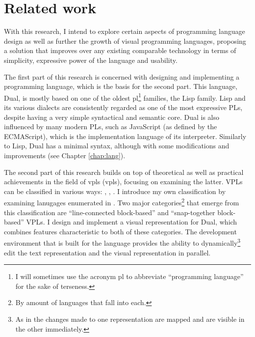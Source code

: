 \section{Related work}
With this research, I intend to explore certain aspects of programming language design as well as further the growth of visual programming languages, proposing a solution that improves over any existing comparable technology in terms of simplicity, expressive power of the language and usability.

The first part of this research is concerned with designing and implementing a programming language, which is the basis for the second part. This language, Dual, is mostly based on one of the oldest \acrshort{pl}\footnote{I will sometimes use the acronym \acrshort{pl} to abbreviate ``programming language'' for the sake of terseness.} families, the Lisp\cite{lisp_draft}\cite{lisp_wikipedia} family. Lisp and its various dialects are consistently regarded as one of the most expressive PLs\cite{lisp_expressive, lisp_powerful}, despite having a very simple syntactical and semantic core\cite{lisp_simple}. Dual is also influenced by many modern PLs, such as JavaScript (as defined by the ECMAScript\cite{ecmascript}), which is the implementation language of its interpreter. Similarly to Lisp, Dual has a minimal syntax, although with some modifications and improvements (see Chapter \ref{chap:lang}). 

The second part of this research builds on top of theoretical\cite{visual_languages} as well as practical\cite{snapshots} achievements in the field of \acrlong{vpl}s (\acrshort{vpl}s), focusing on examining the latter. VPLs can be classified in various ways: \cite[Section~VPL-II.B]{visual_languages}, \cite[Section~Types~of~VPLs]{vpl_maturity}, \cite[Section~Definition]{vpl_wikipedia}. I introduce my own classification by examining lanugages enumerated in \cite{snapshots}. Two major categories\footnote{By amount of languages that fall into each.} that emerge from this classification are ``line-connected block-based'' and ``snap-together block-based'' VPLs. I design and implement a visual representation for Dual, which combines features characteristic to both of these categories. The development environment that is built for the language provides the ability to dynamically\footnote{As in the changes made to one representation are mapped and are visible in the other immediately.} edit the text representation and the visual representation in parallel.

